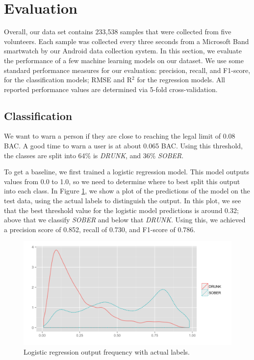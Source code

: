 \section{Evaluation}

Overall, our data set contains 233,538 samples that were collected from five volunteers. Each sample was collected every three seconds from a Microsoft Band smartwatch by our Android data collection system. In this section, we evaluate the performance of a few machine learning models on our dataset. We use some standard performance measures for our evaluation: precision, recall, and F1-score, for the classification models; RMSE and R$^2$ for the regression models. All reported performance values are determined via 5-fold cross-validation.

\subsection{Classification}

We want to warn a person if they are close to reaching the legal limit of 0.08 BAC. A good time to warn a user is at about 0.065 BAC. Using this threshold, the classes are split into 64\% is \textit{DRUNK}, and 36\% \textit{SOBER}.

To get a baseline, we first trained a logistic regression model. This model outputs values from 0.0 to 1.0, so we need to determine where to best split this output into each class. In Figure \ref{fig:log_pred_density}, we show a plot of the predictions of the model on the test data, using the actual labels to distinguish the output. In this plot, we see that the best threshold value for the logistic model predictions is around 0.32; above that we classify \textit{SOBER} and below that \textit{DRUNK}. Using this, we achieved a precision score of 0.852, recall of 0.730, and F1-score of 0.786.

\begin{figure}
	\includegraphics[width=1.0\textwidth]{../figs/log_pred_density}
	\caption{Logistic regression output frequency with actual labels.}
	\label{fig:log_pred_density}
\end{figure}

